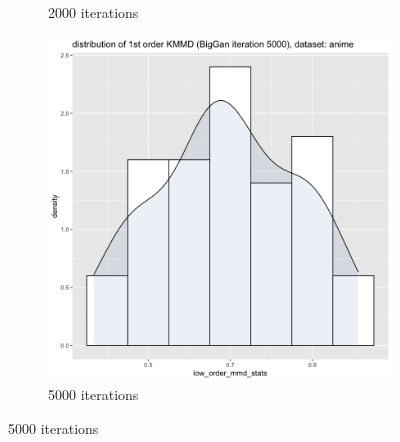 \documentclass{article}
\begin{document}
\begin{figure}[h!]
\begin{subfigure}[b]{0.3\textwidth}
         \caption{2000 iterations}
     \end{subfigure}
     \hfill
     \begin{subfigure}[b]{0.3\textwidth}
         \centering
         \includegraphics[width=\textwidth]{kmmd_figures/biggan_anime_lowdist_5000.png}
         \caption{5000 iterations}
     \end{subfigure}
\end{figure}

\pagebreak
\end{document}
